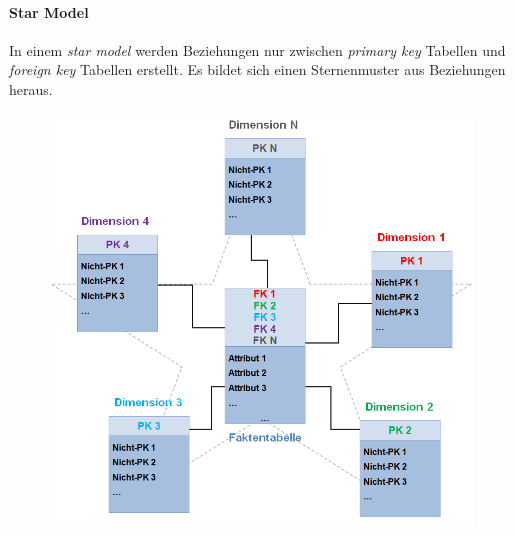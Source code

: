\paragraph{Star Model}
In einem \textit{star model} werden Beziehungen nur zwischen \textit{primary key} Tabellen und \textit{foreign key} Tabellen erstellt. Es bildet sich einen Sternenmuster aus Beziehungen heraus.\begin{figure}[H]
	\centering
	\includegraphics[scale = 0.3]{attachment/chapter_1/screenshot061}
	\caption{}
	\label{fig:screenshot061}
\end{figure}

